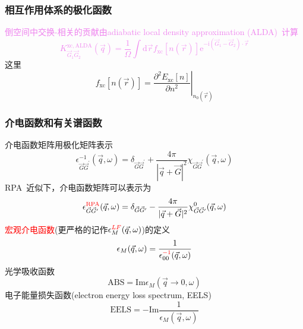 \documentclass[cjk,slidestop,compress,mathserif,blue]{beamer}
\begin{document}
\frame
{
	\frametitle{相互作用体系的极化函数}
	\textcolor{violet}{倒空间中交换-相关的贡献由\textrm{adiabatic local density approximation (ALDA)}~计算
	\begin{displaymath}
		K_{\vec G_1\vec G_2}^{\mathrm{xc,ALDA}}(\vec q)=\frac1{\Omega}\int\mathrm{d}\vec rf_{\mathrm{xc}}[n(\vec r)]\mathrm{e}^{-\mathrm{i}(\vec G_1-\vec G_2)\cdot\vec r}
	\end{displaymath}}
	这里
	\begin{displaymath}
		f_{\mathrm{xc}}[n(\vec r)]=\left.\frac{\partial^2E_{\mathrm{xc}}[n]}{\partial n^2}\right|_{n_0(\vec r)}
	\end{displaymath}
}

\frame
{
	\frametitle{介电函数和有关谱函数}
	介电函数矩阵用极化矩阵表示
	\begin{displaymath}
		\epsilon_{\vec G\vec G^{\prime}}^{-1}(\vec q,\omega)=\delta_{\vec G\vec G^{\prime}}+\frac{4\pi}{|\vec q+\vec G|^2}\chi_{\vec G\vec G^{\prime}}(\vec q,\omega)
	\end{displaymath}
	\textrm{RPA~}近似下，介电函数矩阵可以表示为
	\begin{displaymath}
		\epsilon_{\vec G\vec G^{\prime}}^{\textcolor{red}{\mathrm{RPA}}}(\vec q,\omega)=\delta_{\vec G\vec G^{\prime}}-\frac{4\pi}{|\vec q+\vec G|^2}\chi_{\vec G\vec G^{\prime}}^0(\vec q,\omega)
	\end{displaymath}
	\textcolor{red}{宏观介电函数}(更严格的记作$\epsilon_M^{\textcolor{red}{LF}}(\vec q,\omega)$)的定义
	\begin{displaymath}
		\epsilon_M(\vec q,\omega)=\frac1{\epsilon_{00}^{\textcolor{red}{-1}}(\vec q,\omega)}
	\end{displaymath}
	光学吸收函数
	\begin{displaymath}
		\mathrm{ABS}=\mathrm{Im}\epsilon_M(\vec q\rightarrow0,\omega)
	\end{displaymath}
	电子能量损失函数(\textrm{electron energy loss spectrum, EELS})
	\begin{displaymath}
		\mathrm{EELS}=-\mathrm{Im}\frac1{\epsilon_M(\vec q,\omega)}
	\end{displaymath}
}
\end{document}
